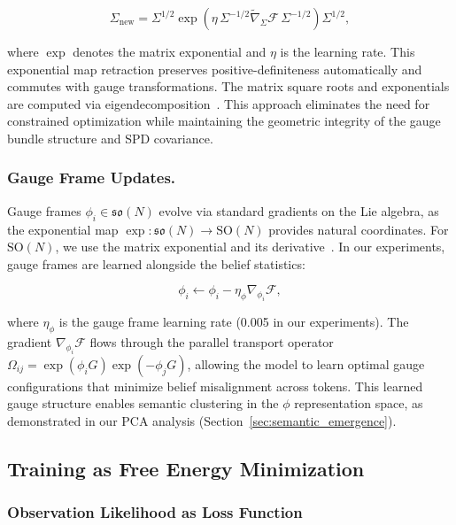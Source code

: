 \documentclass[twoside,11pt]{article}
\begin{document}
\begin{equation}
\Sigma_{\text{new}} = \Sigma^{1/2} \exp\!\left(\eta \, \Sigma^{-1/2} \tilde{\nabla}_\Sigma \mathcal{F} \, \Sigma^{-1/2}\right) \Sigma^{1/2},
\label{eq:spd_retraction}
\end{equation}

where $\exp$ denotes the matrix exponential and $\eta$ is the learning rate. This exponential map retraction preserves positive-definiteness automatically and commutes with gauge transformations. The matrix square roots and exponentials are computed via eigendecomposition~\citep{higham2008functions}. This approach eliminates the need for constrained optimization while maintaining the geometric integrity of the gauge bundle structure and SPD covariance.


\subsubsection{Gauge Frame Updates.}

Gauge frames $\phi_i \in \mathfrak{so}(N)$ evolve via standard gradients on the Lie algebra, as the exponential map $\exp: \mathfrak{so}(N) \to \mathrm{SO}(N)$ provides natural coordinates. For $\mathrm{SO}(N)$, we use the matrix exponential and its derivative~\citep{gallier2020differential}. In our experiments, gauge frames are learned alongside the belief statistics:

\begin{equation}
\phi_i \leftarrow \phi_i - \eta_\phi \nabla_{\phi_i} \mathcal{F},
\end{equation}

where $\eta_\phi$ is the gauge frame learning rate (0.005 in our experiments). The gradient $\nabla_{\phi_i} \mathcal{F}$ flows through the parallel transport operator $\Omega_{ij} = \exp(\phi_i G) \exp(-\phi_j G)$, allowing the model to learn optimal gauge configurations that minimize belief misalignment across tokens. This learned gauge structure enables semantic clustering in the $\phi$ representation space, as demonstrated in our PCA analysis (Section~\ref{sec:semantic_emergence}).

\subsection{Training as Free Energy Minimization}
\subsubsection{Observation Likelihood as Loss Function}
\end{document}
